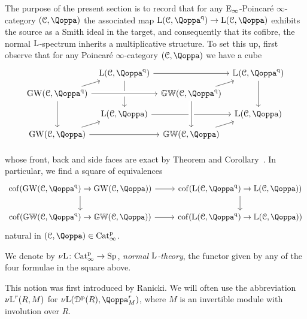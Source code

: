 The purpose of the present section is to record that for any ${\mathrm{E}_{\infty}}$-Poincar\'e $\infty$-category $(\C,\QF)$ the associated map $\L(\C,\QF^\qdr) \rightarrow \L(\C,\QF)$ exhibits the source as a Smith ideal in the target, and consequently that its cofibre, the normal $\operatorname L$-spectrum inherits a multiplicative structure. To set this up, first observe that for any Poincar\'e $\infty$-category $(\C,\QF)$ we have a cube 
\[
\begin{tikzcd}
[column sep=0.5em, row sep=0.7em]
  & \L(\C,\QF^\qdr)\ar[rr]\ar[dd] && \KL(\C,\QF^\qdr)\ar[dd]\\
\GW(\C,\QF^\qdr)\ar[ru]\ar[rr, crossing over]\ar[dd] && \KGW(\C,\QF^\qdr)\ar[ur]\\
  & \L(\C,\QF)\ar[rr] && \KL(\C,\QF)\\
\GW(\C,\QF)\ar[rr] \ar[ru] && \KGW(\C,\QF)\ar[uu,<-, crossing over] \ar[ru]\\
\end{tikzcd}
\]
whose front, back and side faces are exact by Theorem  and Corollary~.
In particular, we find a square of equivalences
\[
\begin{tikzcd}
\cof(\GW(\C,\QF^\qdr) \rightarrow \GW(\C,\QF)) \ar[r] \ar[d] & \cof(\L(\C,\QF^\qdr) \rightarrow \L(\C,\QF)) \ar[d] \\
\cof(\KGW(\C,\QF^\qdr) \rightarrow \KGW(\C,\QF)) \ar[r] & \cof(\KL(\C,\QF^\qdr) \rightarrow \KL(\C,\QF))
\end{tikzcd}
\]
natural in $(\C,\QF) \in \Catp$.

\begin{definition}
We denote by ${\nu\!\operatorname L} \colon \mathrm{Cat}^{\mathrm p}_\infty \rightarrow \mathrm{Sp}$, \emph{normal $\operatorname L$-theory}, the functor given by any of the four formulae in the square above.
\end{definition}

This notion was first introduced by Ranicki.
We will often use the abbreviation ${\nu\!\operatorname L}^r(R,M)$ for $\NL(\Dperf(R),\QF^r_M)$, where $M$ is an invertible module with involution over $R$.

